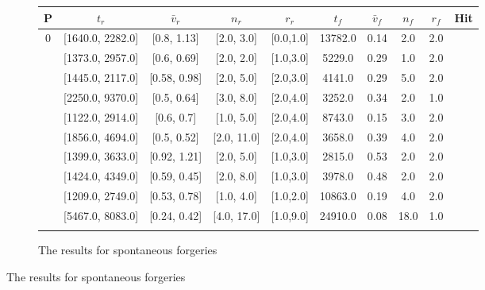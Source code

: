\documentclass[a4paper, oneside]{csthesis}
\newcommand{\cmark}{\ding{51}}%
\newcommand{\xmark}{\ding{55}}%
\begin{document}
\begin{figure}
    \centering
    \begin{subfigure}[b]{\textwidth}
            \centering
            \tabcolsep 4pt
            \small
            \begin{tabular}{c|cccc||cccc||c}
            \hline
            \textbf{P} & $t_r$ & $\bar{v}_r$ & $n_r$ & $r_r$ & $t_f$ & $\bar{v}_f$ & $n_f$ & $r_f$ & Hit \\
            \hline
            0 & [1640.0, 2282.0] & [0.8, 1.13] & [2.0, 3.0] & [0.0,1.0] & 13782.0 & 0.14 & 2.0 & 2.0 & \xmark \\ \hdashline[0.5pt/3pt]
            1 & [1373.0, 2957.0] & [0.6, 0.69] & [2.0, 2.0] & [1.0,3.0] & 5229.0 & 0.29 & 1.0 & 2.0 & \xmark\\ \hdashline[0.5pt/3pt]
            2 & [1445.0, 2117.0] & [0.58, 0.98] & [2.0, 5.0] & [2.0,3.0] & 4141.0 & 0.29 & 5.0 & 2.0 & \xmark\\ \hdashline[0.5pt/3pt]
            3 & [2250.0, 9370.0] & [0.5, 0.64] & [3.0, 8.0] & [2.0,4.0] & 3252.0 & 0.34 & 2.0 & 1.0 & \xmark \\ \hdashline[0.5pt/3pt]
            4 & [1122.0, 2914.0] & [0.6, 0.7] & [1.0, 5.0] & [2.0,4.0] & 8743.0 & 0.15 & 3.0 & 2.0 & \xmark \\ \hdashline[0.5pt/3pt]
            5 & [1856.0, 4694.0] & [0.5, 0.52] & [2.0, 11.0] & [2.0,4.0] & 3658.0 & 0.39 & 4.0 & 2.0 & \xmark \\ \hdashline[0.5pt/3pt]
            6 & [1399.0, 3633.0] & [0.92, 1.21] & [2.0, 5.0] & [1.0,3.0] & 2815.0 & 0.53 & 2.0 & 2.0 & \xmark \\ \hdashline[0.5pt/3pt]
            7 & [1424.0, 4349.0] & [0.59, 0.45] & [2.0, 8.0] & [1.0,3.0] & 3978.0 & 0.48 & 2.0 & 2.0 & \cmark \\ \hdashline[0.5pt/3pt]
            8 & [1209.0, 2749.0] & [0.53, 0.78] & [1.0, 4.0] & [1.0,2.0] & 10863.0 & 0.19 & 4.0 & 2.0 & \xmark \\ \hdashline[0.5pt/3pt]
            9 & [5467.0, 8083.0] & [0.24, 0.42] & [4.0, 17.0] & [1.0,9.0] & 24910.0 & 0.08 & 18.0 & 1.0 & \xmark \\ \hdashline[0.5pt/3pt]
            \hline
            \end{tabular}
            \label{tbl:global-features-forg-spontaneous}
            \caption{The results for spontaneous forgeries}
    \end{subfigure}%


\end{figure}
\end{document}
